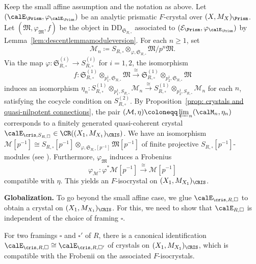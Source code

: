 \begin{construction} \label{construction:crystal-small-affine}
Keep the small affine assumption and the notation as above.
Let $(\calE_\Prism,\varphi_{\calE_\Prism})$ be an analytic prismatic $F$-crystal over $(X,M_X)_\Prism$. Let $(\mathfrak{M}, \varphi_{\mathfrak{M}}, f)$ be the object in $\mathrm{DD}_{\mathfrak{S}_{R,\square}}$ associated to $(\mathcal{E}_{\Prism},\varphi_{\calE_\Prism})$ by Lemma~\ref{lem:descentlemmamoduleversion}. For each $n \geq 1$, set 
\[
\mathcal{M}_n \coloneqq S_{R, \square}\otimes_{\varphi, \mathfrak{S}_{R, \square}} \mathfrak{M}/p^n\mathfrak{M}. 
\]
Via the map $\varphi\colon \mathfrak{S}_{R, \square}^{(i)} \rightarrow S_{R, \square}^{(i)}$ for $i = 1, 2$, the isomorphism
\[
f\colon \mathfrak{S}_{R, \square}^{(1)}\otimes_{p^1_1,\mathfrak{S}_{R, \square}}\mathfrak{M}\xrightarrow{\cong}\mathfrak{S}_{R, \square}^{(1)}\otimes_{p^1_2,\mathfrak{S}_{R, \square}}\mathfrak{M}
\]
induces an isomorphism $\eta_n\colon S_{R, \square}^{(1)}\otimes_{p^1_1,S_{R, \square}}\mathcal{M}_n \xrightarrow{\cong} S_{R, \square}^{(1)}\otimes_{p^1_2, S_{R, \square}}\mathcal{M}_n$ for each $n$, satisfying the cocycle condition on $S_{R, \square}^{(2)}$. By Proposition~\ref{prop: crystals and quasi-nilpotent connections}, the pair $(\mathcal{M},\eta)\coloneqq \varprojlim_n(\calM_n,\eta_n)$ corresponds to a finitely generated quasi-coherent crystal $\calE_{\cris,S_{R,\square}} \in \CR((X_1,M_{X_1})_\CRIS)$.
We have an isomorphism $\mathcal{M}[p^{-1}] \cong S_{R, \square}[p^{-1}]\otimes_{\varphi, \mathfrak{S}_{R, \square}[p^{-1}]} \mathfrak{M}[p^{-1}]$ of finite projective ${S}_{R, \square}[p^{-1}]$-modules (see \cite[Lem.~3.24(iv)]{du-liu-moon-shimizu-completed-prismatic-F-crystal-loc-system}). Furthermore, $\varphi_{\mathfrak{M}}$ induces a Frobenius 
\[
\varphi_{\mathcal{M}}\colon \varphi^* \mathcal{M}[p^{-1}] \stackrel{\cong}{\rightarrow} \mathcal{M}[p^{-1}]
\]
compatible with $\eta$. This yields an $F$-isocrystal on $(X_1,M_{X_1})_\CRIS$. 
\end{construction}


\smallskip
\noindent
\textbf{Globalization.} To go beyond the small affine case, we glue $\calE_{\cris,R,\square}$ to obtain a crystal on $(X_1,M_{X_1})_\CRIS$. For this, we need to show that $\calE_{R,\square}$ is independent of the choice of framing $\square$.

\begin{lem}\label{lem:independence of framing for associated crystalline crystal}
For two framings $\square$ and $\square'$ of $R$, there is a canonical identification $\calE_{\cris,R,\square}\cong \calE_{\cris,R,\square'}$ of crystals on $(X_1,M_{X_1})_\CRIS$, which is compatible with the Frobenii on the associated $F$-isocrystals.
\end{lem}

